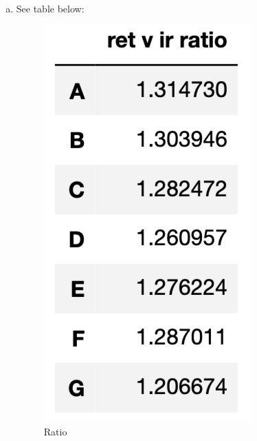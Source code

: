 \documentclass{article}
\begin{document}
\begin{enumerate}[(a)]
   
   \item See table below:
     \begin{figure}[h!]
    \centering
    \includegraphics[scale=0.50]{result}
    \caption{Ratio}
    \label{fig:original fico_hist}
    \end{figure}
   
   
 \end{enumerate}
 
\newpage
 
\end{document}
